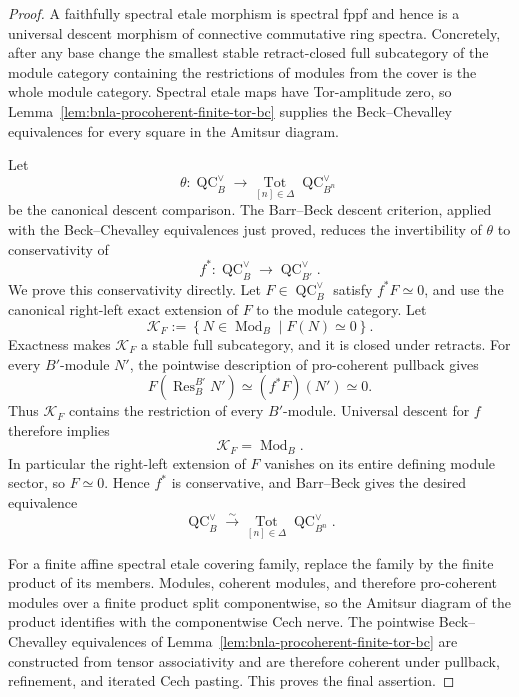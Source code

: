 \begin{proof}
A faithfully spectral etale morphism is spectral fppf and hence is a universal
descent morphism of connective commutative ring spectra.  Concretely, after
any base change the smallest stable retract-closed full subcategory of the
module category containing the restrictions of modules from the cover is the
whole module category.  Spectral etale maps have Tor-amplitude zero, so
Lemma~\ref{lem:bnla-procoherent-finite-tor-bc} supplies the
Beck--Chevalley equivalences for every square in the Amitsur diagram.

Let
\[
    \theta:
    \operatorname{QC}^{\vee}_B
    \longrightarrow
    \operatorname*{Tot}_{[n]\in\Delta}
    \operatorname{QC}^{\vee}_{B^n}
\]
be the canonical descent comparison.  The Barr--Beck descent criterion,
applied with the Beck--Chevalley equivalences just proved, reduces the
invertibility of $\theta$ to conservativity of
\[
    f^*:
    \operatorname{QC}^{\vee}_B
    \longrightarrow
    \operatorname{QC}^{\vee}_{B'}.
\]
We prove this conservativity directly.  Let
$F\in\operatorname{QC}^{\vee}_B$ satisfy $f^*F\simeq0$, and use the
canonical right-left exact extension of $F$ to the module category.  Let
\[
    \mathcal K_F
    :=
    \left\{
        N\in\operatorname{Mod}_B
        \mid
        F(N)\simeq0
    \right\}.
\]
Exactness makes $\mathcal K_F$ a stable full subcategory, and it is closed
under retracts.  For every $B'$-module $N'$, the pointwise description of
pro-coherent pullback gives
\[
    F\left(\operatorname{Res}^{B'}_BN'\right)
    \simeq
    (f^*F)(N')
    \simeq0.
\]
Thus $\mathcal K_F$ contains the restriction of every $B'$-module.  Universal
descent for $f$ therefore implies
\[
    \mathcal K_F=\operatorname{Mod}_B.
\]
In particular the right-left extension of $F$ vanishes on its entire defining
module sector, so $F\simeq0$.  Hence $f^*$ is conservative, and Barr--Beck
gives the desired equivalence
\[
    \operatorname{QC}^{\vee}_B
    \xrightarrow{\sim}
    \operatorname*{Tot}_{[n]\in\Delta}
    \operatorname{QC}^{\vee}_{B^n}.
\]

For a finite affine spectral etale covering family, replace the family by the
finite product of its members.  Modules, coherent modules, and therefore
pro-coherent modules over a finite product split componentwise, so the
Amitsur diagram of the product identifies with the componentwise Cech nerve.
The pointwise Beck--Chevalley equivalences of
Lemma~\ref{lem:bnla-procoherent-finite-tor-bc} are constructed from tensor
associativity and are therefore coherent under pullback, refinement, and
iterated Cech pasting.  This proves the final assertion.
\end{proof}

